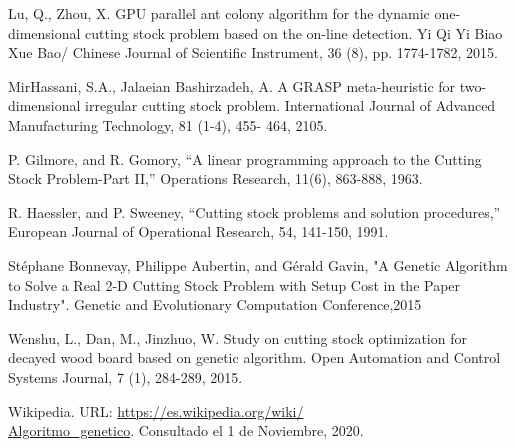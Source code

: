 \documentclass[a4paper,10pt,twocolumn]{article}
\begin{document}
\begin{thebibliography}{99}
	Lu, Q., Zhou, X. GPU parallel ant colony algorithm
	for the dynamic one-dimensional cutting stock problem
	based on the on-line detection. Yi Qi Yi Biao Xue Bao/
	Chinese Journal of Scientific Instrument, 36 (8), pp.
	1774-1782, 2015.
	
	 MirHassani, S.A., Jalaeian Bashirzadeh, A. A
	GRASP meta-heuristic for two-dimensional irregular
	cutting stock problem. International Journal of
	Advanced Manufacturing Technology, 81 (1-4), 455-
	464, 2105.
	
	 P. Gilmore, and R. Gomory, “A linear programming
	approach to the Cutting Stock Problem-Part II,”
	Operations Research, 11(6), 863-888, 1963.
	
	 R. Haessler, and P. Sweeney, “Cutting stock
	problems and solution procedures,” European Journal
	of Operational Research, 54, 141-150, 1991.
	
	 Stéphane Bonnevay, Philippe Aubertin, and Gérald Gavin, "A Genetic Algorithm to Solve a Real 2-D Cutting Stock
	Problem with Setup Cost in the Paper Industry". Genetic and Evolutionary Computation Conference,2015
	
	  Wenshu, L., Dan, M., Jinzhuo, W. Study on cutting
	stock optimization for decayed wood board based
	on genetic algorithm. Open Automation and Control
	Systems Journal, 7 (1), 284-289, 2015.
	
	 Wikipedia. URL: \href{https://es.wikipedia.org/wiki/Algoritmo\_genetico}
	{https://es.wikipedia.org/wiki/ \\Algoritmo\_genetico}.
	Consultado el 1 de Noviembre, 2020.

\end{thebibliography}


\label{end}
\end{document}
